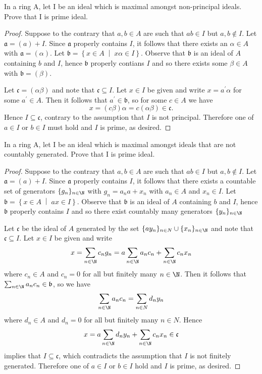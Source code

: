 \documentclass[10pt]{amsart}
\begin{document}
\begin{thm}
	In a ring A, let I be an ideal which is maximal amongst non-principal ideals. 
	Prove that I is prime ideal.

	\begin{proof}
		Suppose to the contrary that $a, b \in A$ are such that $ab \in I$ but $a,b \not \in I$.
		Let $\mathfrak{a} = (a) + I$.
		Since $\mathfrak{a}$ properly contains $I$, it follows that there exists an $\alpha \in A$ with $\mathfrak{a} = (\alpha)$.
		Let $\mathfrak{b} = \left\{x \in A \;\middle\vert\; x\alpha \in I\right\}$.
		Observe that $\mathfrak{b}$ is an ideal of $A$ containing $b$ and $I$, hence $\mathfrak{b}$ properly contians $I$ and so there exists some $\beta \in A$ with $\mathfrak{b} = (\beta)$.

		Let $\mathfrak{c} = (\alpha \beta)$  and note that $\mathfrak{c} \subseteq I$.
		Let $x \in I$ be given and write $x = a^\prime \alpha$ for some $a^\prime \in A$.
		Then it follows that $a^\prime \in \mathfrak{b}$, so for some $c \in A$ we have 
		$$x = (c\beta)\alpha = c(\alpha \beta) \in \mathfrak{c}.$$
		Hence $I \subseteq \mathfrak{c}$, contrary to the assumption that $I$ is not principal.
		Therefore one of $a \in I$ or $b \in I$ must hold and $I$ is prime, as desired.
	\end{proof}
\end{thm}

\begin{thm}
	In a ring A, let I be an ideal which is maximal amongst ideals that are not countably generated. 
	Prove that I is prime ideal.

\begin{proof}
	Suppose to the contrary that $a, b \in A$ are such that $ab \in I$ but $a,b \not \in I$.
	Let $\mathfrak{a} = (a) + I$.
	Since $\mathfrak{a}$ properly contains $I$, it follows that there exists a countable set of generators $\{g_n\}_{n \in \N}$ with $g_n = a_n a + x_n$ with $a_n \in A$ and $x_n \in I$.
	Let $\mathfrak{b} = \left\{x \in A \;\middle\vert\; ax \in I\right\}$.
	Observe that $\mathfrak{b}$ is an ideal of $A$ containing $b$ and $I$, hence $\mathfrak{b}$ properly contains $I$ and so there exist countably many generators $\{y_n\}_{n \in \N}$

	Let $\mathfrak{c}$ be the ideal of $A$ generated by the set $\{ay_n\}_{n \in N} \cup \{x_n\}_{n \in \N}$ and note that $\mathfrak{c} \subseteq I$.
	Let $x \in I$ be given and write 
	$$x = \sum_{n \in \N} c_ng_n = a\sum_{n \in \N}a_nc_n + \sum_{n \in \N}c_n x_n$$
	where $c_n \in A$ and $c_n = 0$ for all but finitely many $n \in \N$.
	Then it follows that $\sum_{n \in \N} a_n c_n \in \mathfrak{b}$, so we have
	$$\sum_{n \in \N} a_n c_n = \sum_{n \in N} d_n y_n$$
	where $d_n \in A$ and $d_n = 0$ for all but finitely many $n \in N$.
	Hence
	$$x =  a\sum_{n \in \N}d_n y_n + \sum_{n \in \N}c_n x_n \in \mathfrak{c}$$
	implies that $I \subseteq \mathfrak{c}$, which contradicts the assumption that $I$ is not finitely generated.
	Therefore one of $a \in I$ or $b \in I$ hold and $I$ is prime, as desired.
\end{proof}
\end{thm}
\end{document}
